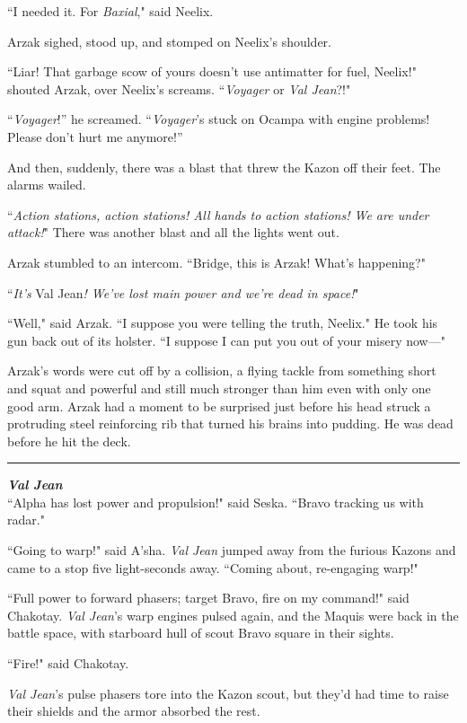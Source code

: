\documentclass[twoside,letterpaper,12pt]{memoir}
\begin{document}
``I needed it. For \textit{Baxial}," said Neelix.

Arzak sighed, stood up, and stomped on Neelix's shoulder.

``Liar! That garbage scow of yours doesn't use antimatter for fuel, Neelix!" shouted Arzak, over Neelix's screams. ``\textit{Voyager} or \textit{Val Jean}?!"

``\textit{Voyager}!” he screamed. ``\textit{Voyager}’s stuck on Ocampa with engine problems! Please don’t hurt me anymore!”

And then, suddenly, there was a blast that threw the Kazon off their feet. The alarms wailed.

``\textit{Action stations, action stations! All hands to action stations! We are under attack!}" There was another blast and all the lights went out.

Arzak stumbled to an intercom. ``Bridge, this is Arzak! What's happening?"

``\textit{It's }Val Jean\textit{! We've lost main power and we're dead in space!}"

``Well," said Arzak. ``I suppose you were telling the truth, Neelix." He took his gun back out of its holster. ``I suppose I can put you out of your misery now---"

Arzak's words were cut off by a collision, a flying tackle from something short and squat and powerful and still much stronger than him even with only one good arm. Arzak had a moment to be surprised just before his head struck a protruding steel reinforcing rib that turned his brains into pudding. He was dead before he hit the deck.

\fancybreak{\rule{3cm}{0.4 pt}}
\noindent\textit{\textbf{Val Jean}}\\

``Alpha has lost power and propulsion!" said Seska. ``Bravo tracking us with radar."

``Going to warp!" said A'sha. \textit{Val Jean} jumped away from the furious Kazons and came to a stop five light-seconds away. ``Coming about, re-engaging warp!"

``Full power to forward phasers; target Bravo, fire on my command!" said Chakotay. \textit{Val Jean}'s warp engines pulsed again, and the Maquis were back in the battle space, with starboard hull of scout Bravo square in their sights.

``Fire!" said Chakotay.

\textit{Val Jean}'s pulse phasers tore into the Kazon scout, but they’d had time to raise their shields and the armor absorbed the rest.
\end{document}
